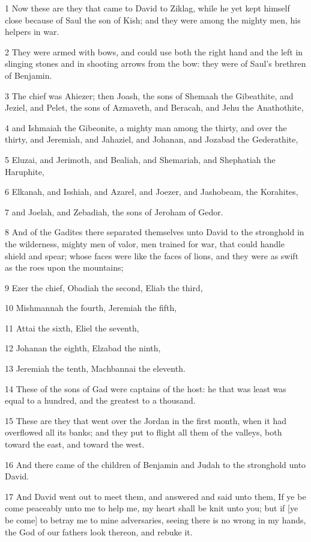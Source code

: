 \par 1 Now these are they that came to David to Ziklag, while he yet kept himself close because of Saul the son of Kish; and they were among the mighty men, his helpers in war.
\par 2 They were armed with bows, and could use both the right hand and the left in slinging stones and in shooting arrows from the bow: they were of Saul's brethren of Benjamin.
\par 3 The chief was Ahiezer; then Joash, the sons of Shemaah the Gibeathite, and Jeziel, and Pelet, the sons of Azmaveth, and Beracah, and Jehu the Anathothite,
\par 4 and Ishmaiah the Gibeonite, a mighty man among the thirty, and over the thirty, and Jeremiah, and Jahaziel, and Johanan, and Jozabad the Gederathite,
\par 5 Eluzai, and Jerimoth, and Bealiah, and Shemariah, and Shephatiah the Haruphite,
\par 6 Elkanah, and Isshiah, and Azarel, and Joezer, and Jashobeam, the Korahites,
\par 7 and Joelah, and Zebadiah, the sons of Jeroham of Gedor.
\par 8 And of the Gadites there separated themselves unto David to the stronghold in the wilderness, mighty men of valor, men trained for war, that could handle shield and spear; whose faces were like the faces of lions, and they were as swift as the roes upon the mountains;
\par 9 Ezer the chief, Obadiah the second, Eliab the third,
\par 10 Mishmannah the fourth, Jeremiah the fifth,
\par 11 Attai the sixth, Eliel the seventh,
\par 12 Johanan the eighth, Elzabad the ninth,
\par 13 Jeremiah the tenth, Machbannai the eleventh.
\par 14 These of the sons of Gad were captains of the host: he that was least was equal to a hundred, and the greatest to a thousand.
\par 15 These are they that went over the Jordan in the first month, when it had overflowed all its banks; and they put to flight all them of the valleys, both toward the east, and toward the west.
\par 16 And there came of the children of Benjamin and Judah to the stronghold unto David.
\par 17 And David went out to meet them, and answered and said unto them, If ye be come peaceably unto me to help me, my heart shall be knit unto you; but if [ye be come] to betray me to mine adversaries, seeing there is no wrong in my hands, the God of our fathers look thereon, and rebuke it.
